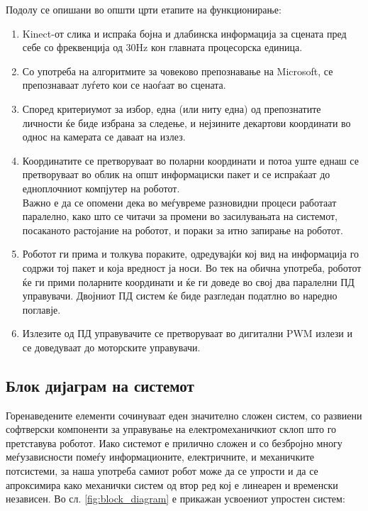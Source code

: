 \documentclass[11pt]{article}
\begin{document}
    Подолу се опишани во општи црти етапите на функционирање:
    \renewcommand{\theenumii}{\arabic{enumii}}
    \renewcommand{\theenumiii}{\arabic{enumiii}}
    \begin{enumerate}
      \item Kinect-от слика и испраќа бојна и длабинска информација за сцената пред себе со фреквенција од 30Hz кон главната процесорска единица.
      \item Со употреба на алгоритмите за човеково препознавање на Microsoft, се препознаваат луѓето кои се наоѓаат во сцената.
      \item Според критериумот за избор, една (или ниту една) од препознатите личности ќе биде избрана за следење, и нејзините декартови координати во однос на камерата се даваат на излез.
      \item Координатите се претворуваат во поларни координати и потоа уште еднаш се претворуваат во облик на општ информациски пакет и се испраќаат до едноплочниот компјутер на роботот.
      \\
      Важно е да се опомени дека во меѓувреме разновидни процеси работаат паралелно, како што се читачи за промени во засилувањата на системот, посаканото растојание на роботот, и пораки за итно запирање на роботот.
      \item Роботот ги прима и толкува пораките, одредувајќи кој вид на информација го содржи тој пакет и која вредност ја носи. Во тек на обична употреба, роботот ќе ги прими поларните координати и ќе ги доведе во свој два паралелни ПД управувачи. Двојниот ПД систем ќе биде разгледан податлно во наредно поглавје.
      \item Излезите од ПД управувачите се претворуваат во дигитални PWM излези и се доведуваат до моторските управувачи.
      \end{enumerate}

  \subsection{Блок дијаграм на системот}
    Горенаведените елементи сочинуваат еден значително сложен систем, со развиени софтверски компоненти за управување на електромеханичкиот склоп што го претставува роботот. Иако системот е прилично сложен и со безбројно многу меѓузависности помеѓу информационите, електричните, и механичките потсистеми, за наша употреба самиот робот може да се упрости и да се апроксимира како механички систем од втор ред кој е линеарен и временски независен. Во сл. \ref{fig:block_diagram} е прикажан усвоениот   упростен систем:\\
\end{document}
